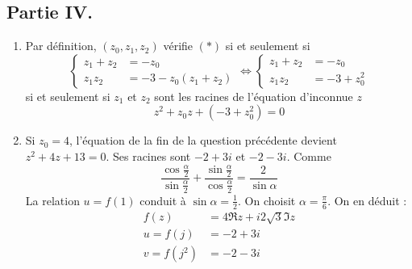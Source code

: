 \subsection*{Partie IV.}
\begin{enumerate}
 \item Par définition, $(z_0,z_1,z_2)$ vérifie $(*)$ si et seulement si
\begin{displaymath}
 \left\lbrace 
\begin{aligned}
 z_1+z_2 &= -z_0 \\
 z_1z_2 &= -3-z_0(z_1+z_2)
\end{aligned}
\right. 
\Leftrightarrow
 \left\lbrace 
\begin{aligned}
 z_1+z_2 &= -z_0 \\
 z_1z_2 &= -3 + z_0^2
\end{aligned}
\right. 
\end{displaymath}
si et seulement si $z_1$ et $z_2$ sont les racines de l'équation d'inconnue $z$
\begin{displaymath}
 z^2+z_0z+(-3+z_0^2)=0
\end{displaymath}

\item Si $z_0=4$, l'équation de la fin de la question précédente devient $z^2+4z+13=0$. Ses racines sont $-2+3i$ et $-2-3i$. Comme
\begin{displaymath}
 \dfrac{\cos\frac{\alpha}{2}}{\sin \frac{\alpha}{2}} + \dfrac{\sin \frac{\alpha}{2}}{\cos\frac{\alpha}{2}}=
\dfrac{2}{\sin \alpha} 
\end{displaymath}
La relation $u=f(1)$ conduit à $\sin \alpha = \frac{1}{2}$. On choisit $\alpha =\frac{\pi}{6}$. On en déduit :
\begin{align*}
 f(z) &= 4\Re z + i 2\sqrt{3}\Im z\\
u = f(j) &=-2+3i \\
v = f(j^2) &= -2-3i
\end{align*}

\end{enumerate}
